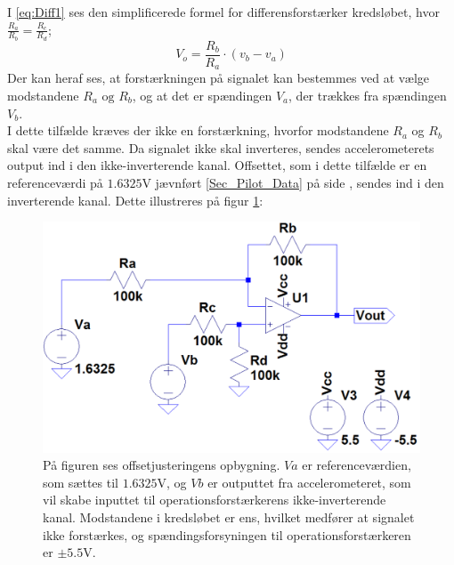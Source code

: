 \noindent I \eqref{eq:Diff1} ses den simplificerede formel for differensforstærker kredsløbet, hvor $\frac{R_a}{R_b} = \frac{R_c}{R_d}$;
\begin{equation}\label{eq:Diff1}
V_o = \frac{R_b}{R_a} \cdot (v_b - v_a)
\end{equation}
\noindent Der kan heraf ses, at forstærkningen på signalet kan bestemmes ved at vælge modstandene $R_a\text{ og }R_b$, og at det er spændingen $V_{a}$, der trækkes fra spændingen $V_{b}$. \\
I dette tilfælde kræves der ikke en forstærkning, hvorfor modstandene $R_{a}$ og $R_{b}$ skal være det samme. Da signalet ikke skal inverteres, sendes accelerometerets output ind i den ikke-inverterende kanal. Offsettet, som i dette tilfælde er en referenceværdi på $1.6325$V jævnført \ref{Sec_Pilot_Data} på side \pageref{Sec_Pilot_Data}, sendes ind i den inverterende kanal. Dette illustreres på figur \ref{fig:Offset_generisk}:
\begin{figure}[H]
\centering
\includegraphics[scale=0.4]{figures/cProblemloesning/Offset_generisk.png}
\caption{På figuren ses offsetjusteringens opbygning. $Va$ er referenceværdien, som sættes til $1.6325$V, og $Vb$ er outputtet fra accelerometeret, som vil skabe inputtet til operationsforstærkerens ikke-inverterende kanal. Modstandene i kredsløbet er ens, hvilket medfører at signalet ikke forstærkes, og spændingsforsyningen til operationsforstærkeren er $\pm5.5$V.}
\label{fig:Offset_generisk}
\end{figure}

